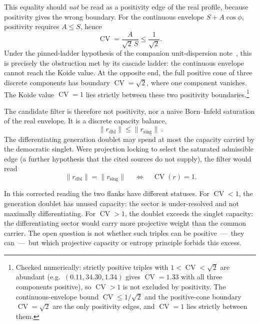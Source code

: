 \documentclass[11pt]{article}
\theoremstyle{definition}
\theoremstyle{remark}
\newcommand{\CV}{\operatorname{CV}}
\begin{document}
    This equality should \emph{not} be read as a positivity edge of the real profile, because positivity gives the
    wrong boundary.
    For the continuous envelope $S + A\cos\phi$, positivity requires $A \le S$, hence
    \begin{equation}
      \label{eq:envelope}
      \CV = \frac{A}{\sqrt2\,S} \le \frac{1}{\sqrt2} .
    \end{equation}
    Under the pinned-ladder hypothesis of the companion unit-dispersion note~\cite{Beau2026kud}, this is precisely
    the obstruction met by its cascade ladder: the continuous envelope cannot reach the Koide value.
    At the opposite end, the full positive cone of three discrete components has boundary $\CV = \sqrt2$, where one
    component vanishes.
    The Koide value $\CV = 1$ lies strictly between these two positivity boundaries.\footnote{%
      Checked numerically: strictly positive triples with $1 < \CV < \sqrt2$ are abundant (e.g.\ $(0.11, 34.30,
      1.34)$ gives $\CV = 1.33$ with all three components positive), so $\CV > 1$ is not excluded by positivity.
      The continuous-envelope bound $\CV \le 1/\sqrt2$ and the positive-cone boundary $\CV = \sqrt2$ are the only
      positivity edges, and $\CV = 1$ lies strictly between them.}

    The candidate filter is therefore not positivity, nor a naive Born--Infeld saturation of the real envelope.
    It is a discrete capacity balance,
    \begin{equation}
      \label{eq:filter}
      \boxed{\ \lVert r_{\mathrm{dbl}} \rVert \le \lVert r_{\mathrm{sing}} \rVert\ } .
    \end{equation}
    The differentiating generation doublet may spend at most the capacity carried by the democratic singlet.
    Were projection locking to select the saturated admissible edge (a further hypothesis that the cited sources do not supply),
    the filter would read
    \begin{equation}
      \label{eq:filter-sat}
      \boxed{\ \lVert r_{\mathrm{dbl}} \rVert = \lVert r_{\mathrm{sing}} \rVert\ }
      \quad\Longleftrightarrow\quad \CV(r) = 1 .
    \end{equation}

    In this corrected reading the two flanks have different statuses.
    For $\CV < 1$, the generation doublet has unused capacity: the sector is under-resolved and not maximally
    differentiating.
    For $\CV > 1$, the doublet exceeds the singlet capacity: the differentiating sector would carry more projective
    weight than the common carrier.
    The open question is not whether such triples can be positive~---~they can~---~but which projective capacity or
    entropy principle forbids this excess.
\end{document}
